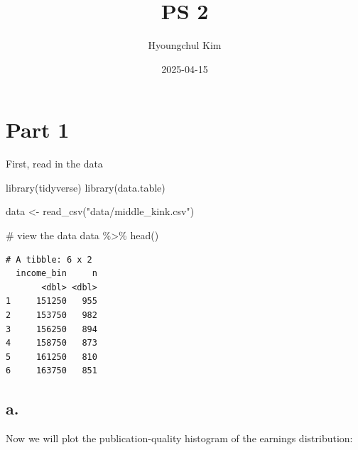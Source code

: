 \documentclass[
  letterpaper,
  DIV=11,
  numbers=noendperiod]{scrartcl}
\title{PS 2}
\author{Hyoungchul Kim}
\date{2025-04-15}
\newenvironment{Shaded}{\begin{snugshade}}{\end{snugshade}}
\newcommand{\CommentTok}[1]{\textcolor[rgb]{0.37,0.37,0.37}{#1}}
\newcommand{\FunctionTok}[1]{\textcolor[rgb]{0.28,0.35,0.67}{#1}}
\newcommand{\NormalTok}[1]{\textcolor[rgb]{0.00,0.23,0.31}{#1}}
\newcommand{\OtherTok}[1]{\textcolor[rgb]{0.00,0.23,0.31}{#1}}
\newcommand{\SpecialCharTok}[1]{\textcolor[rgb]{0.37,0.37,0.37}{#1}}
\newcommand{\StringTok}[1]{\textcolor[rgb]{0.13,0.47,0.30}{#1}}
\begin{document}
\maketitle


\section{Part 1}\label{part-1}

First, read in the data

\begin{Shaded}
\begin{Highlighting}[]
\FunctionTok{library}\NormalTok{(tidyverse)}
\FunctionTok{library}\NormalTok{(data.table)}

\NormalTok{data }\OtherTok{\textless{}{-}} \FunctionTok{read\_csv}\NormalTok{(}\StringTok{"data/middle\_kink.csv"}\NormalTok{)}

\CommentTok{\# view the data}
\NormalTok{data }\SpecialCharTok{\%\textgreater{}\%} \FunctionTok{head}\NormalTok{()}
\end{Highlighting}
\end{Shaded}

\begin{verbatim}
# A tibble: 6 x 2
  income_bin     n
       <dbl> <dbl>
1     151250   955
2     153750   982
3     156250   894
4     158750   873
5     161250   810
6     163750   851
\end{verbatim}

\subsection{a.}\label{a.}

Now we will plot the publication-quality histogram of the earnings
distribution:
\end{document}

